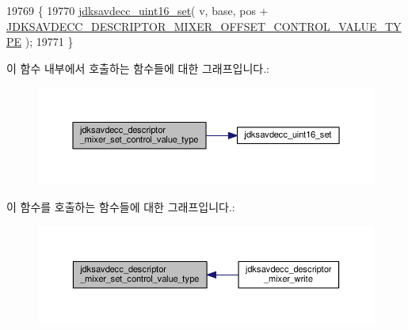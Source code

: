 \begin{DoxyCode}
19769 \{
19770     \hyperlink{group__endian_ga14b9eeadc05f94334096c127c955a60b}{jdksavdecc\_uint16\_set}( v, base, pos + 
      \hyperlink{group__descriptor__mixer_ga3d396bfa44355854b835ba88519b8149}{JDKSAVDECC\_DESCRIPTOR\_MIXER\_OFFSET\_CONTROL\_VALUE\_TYPE} 
      );
19771 \}
\end{DoxyCode}


이 함수 내부에서 호출하는 함수들에 대한 그래프입니다.\+:
\nopagebreak
\begin{figure}[H]
\begin{center}
\leavevmode
\includegraphics[width=350pt]{group__descriptor__mixer_ga771f98126a9ce6bc1258b4e539771873_cgraph}
\end{center}
\end{figure}




이 함수를 호출하는 함수들에 대한 그래프입니다.\+:
\nopagebreak
\begin{figure}[H]
\begin{center}
\leavevmode
\includegraphics[width=350pt]{group__descriptor__mixer_ga771f98126a9ce6bc1258b4e539771873_icgraph}
\end{center}
\end{figure}


